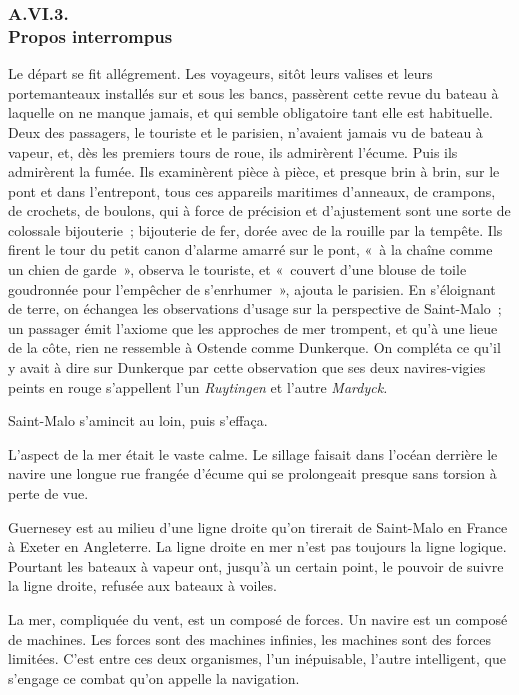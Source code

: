 \documentclass[french,twoside]{book} %
\begin{document}
 \subsubsection[{A.VI.3. Propos interrompus}]{A.VI.3. \\
Propos interrompus}
\noindent Le départ se fit allégrement. Les voyageurs, sitôt leurs valises et leurs portemanteaux installés sur et sous les bancs, passèrent cette revue du bateau à laquelle on ne manque jamais, et qui semble obligatoire tant elle est habituelle. Deux des passagers, le touriste et le parisien, n’avaient jamais vu de bateau à vapeur, et, dès les premiers tours de roue, ils admirèrent l’écume. Puis ils admirèrent la fumée. Ils examinèrent pièce à pièce, et presque brin à brin, sur le pont et dans l’entrepont, tous ces appareils maritimes d’anneaux, de crampons, de crochets, de boulons, qui à force de précision et d’ajustement sont une sorte de colossale bijouterie ; bijouterie de fer, dorée avec de la rouille par la tempête. Ils firent le tour du petit canon d’alarme amarré sur le pont, « à la chaîne comme un chien de garde », observa le touriste, et « couvert d’une blouse de toile goudronnée pour l’empêcher de s’enrhumer », ajouta le parisien. En s’éloignant de  terre, on échangea les observations d’usage sur la perspective de Saint-Malo ; un passager émit l’axiome que les approches de mer trompent, et qu’à une lieue de la côte, rien ne ressemble à Ostende comme Dunkerque. On compléta ce qu’il y avait à dire sur Dunkerque par cette observation que ses deux navires-vigies peints en rouge s’appellent l’un \emph{Ruytingen} et l’autre \emph{Mardyck.}\par
Saint-Malo s’amincit au loin, puis s’effaça.\par
L’aspect de la mer était le vaste calme. Le sillage faisait dans l’océan derrière le navire une longue rue frangée d’écume qui se prolongeait presque sans torsion à perte de vue.\par
Guernesey est au milieu d’une ligne droite qu’on tirerait de Saint-Malo en France à Exeter en Angleterre. La ligne droite en mer n’est pas toujours la ligne logique. Pourtant les bateaux à vapeur ont, jusqu’à un certain point, le pouvoir de suivre la ligne droite, refusée aux bateaux à voiles.\par
La mer, compliquée du vent, est un composé de forces. Un navire est un composé de machines. Les forces sont des machines infinies, les machines sont des forces limitées. C’est entre ces deux organismes, l’un inépuisable, l’autre intelligent, que s’engage ce combat qu’on appelle la navigation.\par
\end{document}
